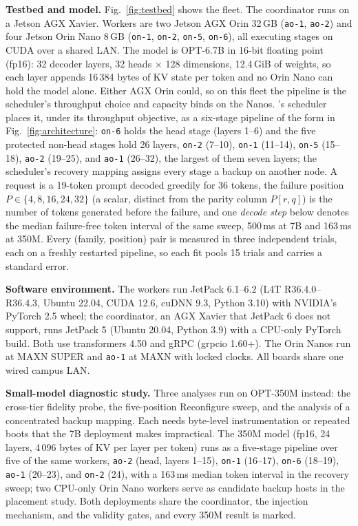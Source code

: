 \textbf{Testbed and model.}  Fig.~\ref{fig:testbed} shows the fleet.  The
coordinator runs on a Jetson AGX Xavier.
Workers are two Jetson AGX Orin 32\,GB (\texttt{ao-1}, \texttt{ao-2}) and
four Jetson Orin Nano 8\,GB (\texttt{on-1}, \texttt{on-2}, \texttt{on-5},
\texttt{on-6}), all executing stages on CUDA over a shared LAN.  The model is
OPT-6.7B in 16-bit floating point (fp16): 32 decoder layers, 32 heads
$\times$ 128 dimensions, 12.4\,GiB of weights, so each layer appends
16\,384 bytes of KV state per token and no Orin Nano can hold the model
alone.  Either AGX Orin could, so on this fleet the pipeline is the
scheduler's throughput choice and capacity binds on the Nanos.  \sys{}'s scheduler places it, under its
throughput objective, as a six-stage pipeline of the form in
Fig.~\ref{fig:architecture}:
\texttt{on-6} holds the head stage (layers 1--6) and the five protected
non-head stages hold 26 layers, \texttt{on-2} (7--10), \texttt{on-1}
(11--14), \texttt{on-5} (15--18), \texttt{ao-2} (19--25), and \texttt{ao-1}
(26--32), the largest of them seven layers; the scheduler's recovery mapping
assigns every stage a backup on another node.  A request is a 19-token prompt decoded
greedily for 36 tokens, the failure position $P\in\{4,8,16,24,32\}$ (a
scalar, distinct from the parity column $P[r,q]$) is the number of tokens
generated before the failure, and one \emph{decode step}
below denotes the median failure-free token interval of the same sweep,
500\,ms at 7B and 163\,ms at 350M.  Every (family, position) pair is
measured in three independent trials, each on a freshly restarted pipeline,
so each fit pools 15 trials and carries a standard error.

\textbf{Software environment.}  The workers run JetPack 6.1--6.2 (L4T R36.4.0--R36.4.3, Ubuntu 22.04,
CUDA 12.6, cuDNN 9.3, Python 3.10) with NVIDIA's PyTorch 2.5 wheel; the coordinator, an AGX Xavier that JetPack 6 does not support, runs
JetPack 5 (Ubuntu 20.04, Python 3.9) with a CPU-only PyTorch build.  Both
use transformers 4.50 and gRPC (grpcio 1.60+).  The Orin Nanos run at MAXN SUPER and \texttt{ao-1} at MAXN with
locked clocks.  All boards share one wired campus LAN.

\textbf{Small-model diagnostic study.}  Three analyses run on OPT-350M instead:
the cross-tier fidelity probe, the five-position Reconfigure sweep, and the
analysis of a concentrated backup mapping.  Each needs byte-level
instrumentation or repeated boots that the 7B deployment makes impractical.
The 350M model (fp16, 24 layers, 4\,096 bytes of KV per layer per token)
runs as a five-stage pipeline over five of the same workers, \texttt{ao-2}
(head, layers 1--15), \texttt{on-1} (16--17), \texttt{on-6} (18--19),
\texttt{ao-1} (20--23), and \texttt{on-2} (24), with a 163\,ms median token
interval in the recovery sweep; two CPU-only Orin Nano workers serve as
candidate backup hosts in the placement study.  Both deployments share the coordinator, the injection
mechanism, and the validity gates, and every 350M result is marked.

